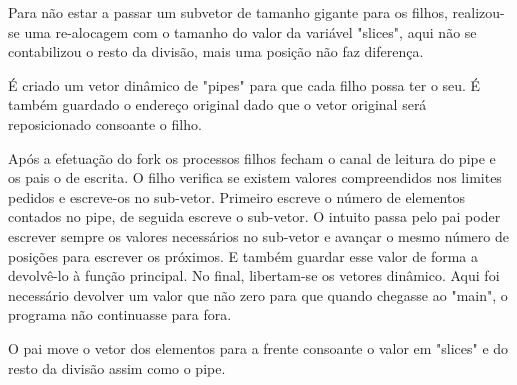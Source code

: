 \documentclass[11pt,a4paper]{report}
\begin{document}
        Para não estar a passar um subvetor de tamanho gigante para os filhos, realizou-se uma re-alocagem com o tamanho do valor da variável "slices", aqui não se
        contabilizou o resto da divisão, mais uma posição não faz diferença.

        É criado um vetor dinâmico de "pipes" para que cada filho possa ter o seu. É também guardado o endereço original dado que o vetor original será
        reposicionado consoante o filho.

        Após a efetuação do fork os processos filhos fecham o canal de leitura do pipe e os pais o de escrita.
        O filho verifica se existem valores compreendidos nos limites pedidos e escreve-os no sub-vetor. Primeiro escreve o número de elementos contados no pipe, de
        seguida escreve o sub-vetor. O intuito passa pelo pai poder escrever sempre os valores necessários no sub-vetor e avançar o mesmo número de posições para
        escrever os próximos. E também guardar esse valor de forma a devolvê-lo à função principal. No final, libertam-se os vetores dinâmico.
        Aqui foi necessário devolver um valor que não zero para que quando chegasse ao "main", o programa não continuasse para fora.

        O pai move o vetor dos elementos para a frente consoante o valor em "slices" e do resto da divisão assim como o pipe.
\end{document}

